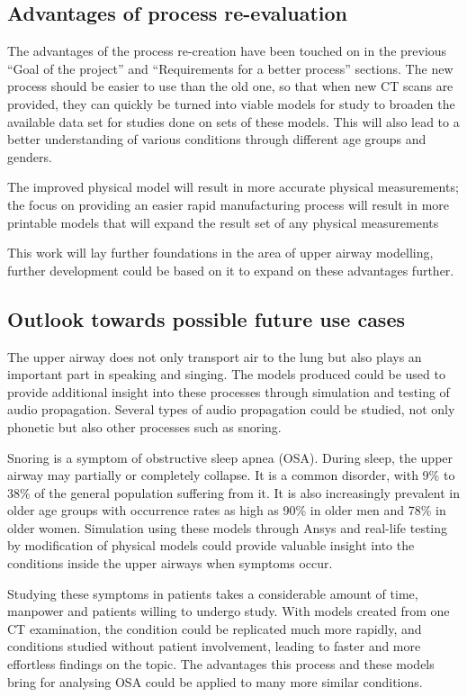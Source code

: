 \documentclass[MME,Projekt,english]{twbook}%
\begin{document}
\subsection{Advantages of process re-evaluation}
The advantages of the process re-creation have been touched on in the previous “Goal of the project” and “Requirements for a better process” sections. The new process should be easier to use than the old one, so that when new CT scans are provided, they can quickly be turned into viable models for study to broaden the available data set for studies done on sets of these models. This will also lead to a better understanding of various conditions through different age groups and genders.

The improved physical model will result in more accurate physical measurements; the focus on providing an easier rapid manufacturing process will result in more printable models that will expand the result set of any physical measurements

This work will lay further foundations in the area of upper airway modelling, further development could be based on it to expand on these advantages further.

\subsection{Outlook towards possible future use cases}
The upper airway does not only transport air to the lung but also plays an important part in speaking and singing. The models produced could be used to provide additional insight into these processes through simulation and testing of audio propagation. Several types of audio propagation could be studied, not only phonetic but also other processes such as snoring.

Snoring is a symptom of obstructive sleep apnea (OSA). During sleep, the upper airway may partially or completely collapse. It is a common disorder, with 9\% to 38\% of the general population suffering from it. It is also increasingly prevalent in older age groups with occurrence rates as high as 90\% in older men and 78\% in older women. Simulation using these models through Ansys and real-life testing by modification of physical models could provide valuable insight into the conditions inside the upper airways when symptoms occur.

Studying these symptoms in patients takes a considerable amount of time, manpower and patients willing to undergo study. With models created from one CT examination, the condition could be replicated much more rapidly, and conditions studied without patient involvement, leading to faster and more effortless findings on the topic. The advantages this process and these models bring for analysing OSA could be applied to many more similar conditions.
\end{document}
